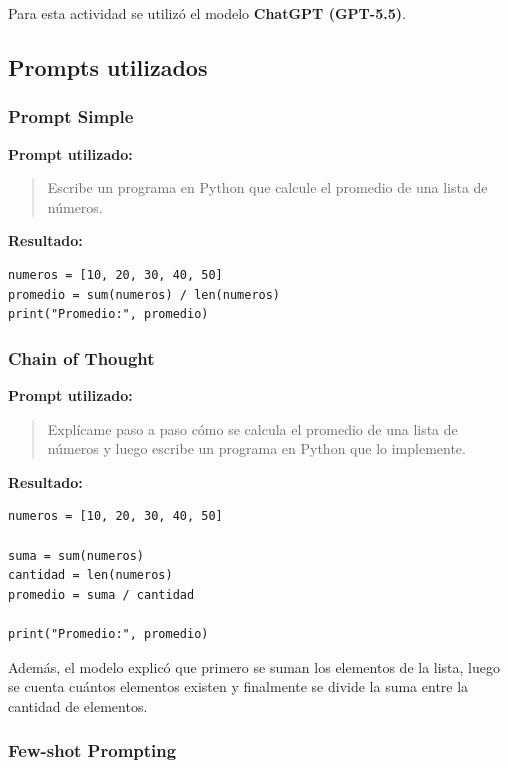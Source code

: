 \documentclass[12pt,a4paper]{article}
\begin{document}
Para esta actividad se utilizó el modelo \textbf{ChatGPT (GPT-5.5)}.

\subsection{Prompts utilizados}

\subsubsection{Prompt Simple}

\textbf{Prompt utilizado:}

\begin{quote}
Escribe un programa en Python que calcule el promedio de una lista de números.
\end{quote}

\textbf{Resultado:}

\begin{verbatim}
numeros = [10, 20, 30, 40, 50]
promedio = sum(numeros) / len(numeros)
print("Promedio:", promedio)
\end{verbatim}

\subsubsection{Chain of Thought}

\textbf{Prompt utilizado:}

\begin{quote}
Explícame paso a paso cómo se calcula el promedio de una lista de números y luego escribe un programa en Python que lo implemente.
\end{quote}

\textbf{Resultado:}

\begin{verbatim}
numeros = [10, 20, 30, 40, 50]

suma = sum(numeros)
cantidad = len(numeros)
promedio = suma / cantidad

print("Promedio:", promedio)
\end{verbatim}

Además, el modelo explicó que primero se suman los elementos de la lista, luego se cuenta cuántos elementos existen y finalmente se divide la suma entre la cantidad de elementos.

\subsubsection{Few-shot Prompting}
\end{document}
